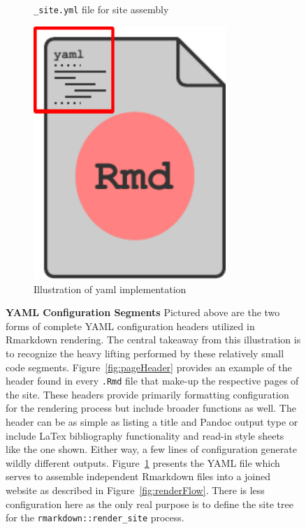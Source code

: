 \documentclass[10pt]{report}
\begin{document}
\begin{figure}
\begin{subfigure}[t]{.3\textwidth}
        \caption{\texttt{\_site.yml} file for site assembly}\label{fig:siteYaml}
    \end{subfigure}
    \hspace{2em}
    \begin{subfigure}[t]{.2\textwidth}
        \center{}
        \includegraphics[width=0.8\textwidth]{fig/yaml_illustration.pdf}
        \caption{Illustration of yaml implementation}\label{fig:yamlIllust}
    \end{subfigure}
    \caption[YAML Configuration Segments]{\textbf{YAML Configuration Segments} Pictured above are the two forms of complete YAML configuration headers utilized in Rmarkdown rendering. The central takeaway from this illustration is to recognize the heavy lifting performed by these relatively small code segments. Figure~\ref{fig:pageHeader} provides an example of the header found in every \texttt{.Rmd} file that make-up the respective pages of the site. These headers provide primarily formatting configuration for the rendering process but include broader functions as well. The header can be as simple as listing a title and Pandoc output type or include LaTex bibliography functionality and read-in style sheets like the one shown. Either way, a few lines of configuration generate wildly different outputs. Figure~\ref{fig:siteYaml} presents the YAML file which serves to assemble independent Rmarkdown files into a joined website as described in Figure~\ref{fig:renderFlow}. There is less configuration here as the only real purpose is to define the site tree for the \texttt{rmarkdown::render\_site} process.}\label{fig:yamls}
\end{figure}
\end{document}
